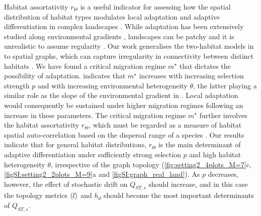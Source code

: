   Habitat assortativity $r_\Theta$ is a useful indicator for assessing how the spatial distribution of habitat types modulates local adaptation and adaptive differentiation in complex landscapes \cite{Richardson2014}.
  While adaptation has been extensively studied along
  environmental gradients \cite{Slatkin1973,Slatkin1978,Kirkpatrick1997,Polechova2015,Polechova2018,AndradeRestrepo2019,Doebeli2003}, landscapes can be patchy and it is unrealistic to assume regularity \cite{Dale2010}.
  Our work generalises the two-habitat models in \cite{Meszena1997,Debarre2013,Mirrahimi2020} to spatial graphs, which can capture irregularity in connectivity between distinct habitats \cite{Dale2010}. 
  We have found a critical migration regime $m^\star$ that dictates the possibility of adaptation. 
   indicates that $m^\star$ increases with increasing selection strength $p$ and with increasing environmental heterogeneity $\theta$, the latter playing a similar role as the slope of the environmental gradient in \cite{Slatkin1973,Slatkin1978,Polechova2015,Polechova2018}. Local adaptation would consequently be sustained under higher migration regimes following an increase in these parameters.
  The critical migration regime $m^\star$ further involves the habitat assortativity $r_\Theta$, which must be regarded as a measure of habitat spatial auto-correlation based on the dispersal range of a species \cite{Richardson2014}. 
  Our results indicate that for general habitat distributions, $r_\Theta$ is the main determinant of adaptive differentiation under sufficiently strong selection $p$ and high habitat heterogeneity $\theta$, irrespective of the graph topology (\cref{fig:setting2_4plots_M=7}c, \cref{figSI:setting2_2plots_M=9}a and \cref{figSI:graph_real_land}).
  As $p$ decreases, however, the effect of stochastic drift on $Q_{ST,s}$ should increase, and in this case the topology metrics $\langle l \rangle$ and $h_d$ should become the most important determinants of $Q_{ST,s}$. 
